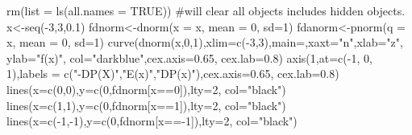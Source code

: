 \documentclass[
  letterpaper,
  DIV=11,
  numbers=noendperiod]{scrartcl}
\newenvironment{Shaded}{\begin{snugshade}}{\end{snugshade}}
\newcommand{\AttributeTok}[1]{\textcolor[rgb]{0.40,0.45,0.13}{#1}}
\newcommand{\CommentTok}[1]{\textcolor[rgb]{0.37,0.37,0.37}{#1}}
\newcommand{\ConstantTok}[1]{\textcolor[rgb]{0.56,0.35,0.01}{#1}}
\newcommand{\DecValTok}[1]{\textcolor[rgb]{0.68,0.00,0.00}{#1}}
\newcommand{\FloatTok}[1]{\textcolor[rgb]{0.68,0.00,0.00}{#1}}
\newcommand{\FunctionTok}[1]{\textcolor[rgb]{0.28,0.35,0.67}{#1}}
\newcommand{\NormalTok}[1]{\textcolor[rgb]{0.00,0.23,0.31}{#1}}
\newcommand{\OtherTok}[1]{\textcolor[rgb]{0.00,0.23,0.31}{#1}}
\newcommand{\SpecialCharTok}[1]{\textcolor[rgb]{0.37,0.37,0.37}{#1}}
\newcommand{\StringTok}[1]{\textcolor[rgb]{0.13,0.47,0.30}{#1}}
\begin{document}
\begin{Shaded}
\begin{Highlighting}[]
\FunctionTok{rm}\NormalTok{(}\AttributeTok{list =} \FunctionTok{ls}\NormalTok{(}\AttributeTok{all.names =} \ConstantTok{TRUE}\NormalTok{)) }\CommentTok{\#will clear all objects includes hidden objects.}
\NormalTok{x}\OtherTok{\textless{}{-}}\FunctionTok{seq}\NormalTok{(}\SpecialCharTok{{-}}\DecValTok{3}\NormalTok{,}\DecValTok{3}\NormalTok{,}\FloatTok{0.1}\NormalTok{)}
\NormalTok{fdnorm}\OtherTok{\textless{}{-}}\FunctionTok{dnorm}\NormalTok{(}\AttributeTok{x =}\NormalTok{ x, }\AttributeTok{mean =} \DecValTok{0}\NormalTok{, }\AttributeTok{sd=}\DecValTok{1}\NormalTok{)  }
\NormalTok{fdanorm}\OtherTok{\textless{}{-}}\FunctionTok{pnorm}\NormalTok{(}\AttributeTok{q =}\NormalTok{ x, }\AttributeTok{mean =} \DecValTok{0}\NormalTok{, }\AttributeTok{sd=}\DecValTok{1}\NormalTok{)}
\FunctionTok{curve}\NormalTok{(}\FunctionTok{dnorm}\NormalTok{(x,}\DecValTok{0}\NormalTok{,}\DecValTok{1}\NormalTok{),}\AttributeTok{xlim=}\FunctionTok{c}\NormalTok{(}\SpecialCharTok{{-}}\DecValTok{3}\NormalTok{,}\DecValTok{3}\NormalTok{),}\AttributeTok{main=}\StringTok{\textquotesingle{}\textquotesingle{}}\NormalTok{,}\AttributeTok{xaxt=}\StringTok{"n"}\NormalTok{,}\AttributeTok{xlab=}\StringTok{"z"}\NormalTok{, }\AttributeTok{ylab=}\StringTok{"f(x)"}\NormalTok{,}
      \AttributeTok{col=}\StringTok{"darkblue"}\NormalTok{,}\AttributeTok{cex.axis=}\FloatTok{0.65}\NormalTok{, }\AttributeTok{cex.lab=}\FloatTok{0.8}\NormalTok{) }
\FunctionTok{axis}\NormalTok{(}\DecValTok{1}\NormalTok{,}\AttributeTok{at=}\FunctionTok{c}\NormalTok{(}\SpecialCharTok{{-}}\DecValTok{1}\NormalTok{, }\DecValTok{0}\NormalTok{, }\DecValTok{1}\NormalTok{),}\AttributeTok{labels =}
       \FunctionTok{c}\NormalTok{(}\StringTok{"{-}DP(X)"}\NormalTok{,}\StringTok{"E(x)"}\NormalTok{,}\StringTok{"DP(x)"}\NormalTok{),}\AttributeTok{cex.axis=}\FloatTok{0.65}\NormalTok{, }\AttributeTok{cex.lab=}\FloatTok{0.8}\NormalTok{) }
\FunctionTok{lines}\NormalTok{(}\AttributeTok{x=}\FunctionTok{c}\NormalTok{(}\DecValTok{0}\NormalTok{,}\DecValTok{0}\NormalTok{),}\AttributeTok{y=}\FunctionTok{c}\NormalTok{(}\DecValTok{0}\NormalTok{,fdnorm[x}\SpecialCharTok{==}\DecValTok{0}\NormalTok{]),}\AttributeTok{lty=}\DecValTok{2}\NormalTok{, }\AttributeTok{col=}\StringTok{"black"}\NormalTok{) }
\FunctionTok{lines}\NormalTok{(}\AttributeTok{x=}\FunctionTok{c}\NormalTok{(}\DecValTok{1}\NormalTok{,}\DecValTok{1}\NormalTok{),}\AttributeTok{y=}\FunctionTok{c}\NormalTok{(}\DecValTok{0}\NormalTok{,fdnorm[x}\SpecialCharTok{==}\DecValTok{1}\NormalTok{]),}\AttributeTok{lty=}\DecValTok{2}\NormalTok{, }\AttributeTok{col=}\StringTok{"black"}\NormalTok{)}
\FunctionTok{lines}\NormalTok{(}\AttributeTok{x=}\FunctionTok{c}\NormalTok{(}\SpecialCharTok{{-}}\DecValTok{1}\NormalTok{,}\SpecialCharTok{{-}}\DecValTok{1}\NormalTok{),}\AttributeTok{y=}\FunctionTok{c}\NormalTok{(}\DecValTok{0}\NormalTok{,fdnorm[x}\SpecialCharTok{=={-}}\DecValTok{1}\NormalTok{]),}\AttributeTok{lty=}\DecValTok{2}\NormalTok{, }\AttributeTok{col=}\StringTok{"black"}\NormalTok{)}
\end{Highlighting}
\end{Shaded}
\end{document}
